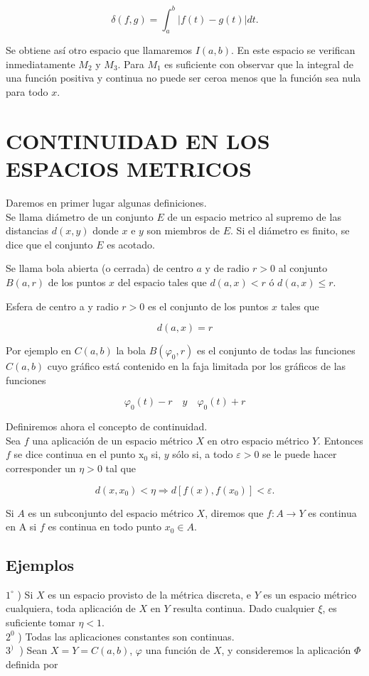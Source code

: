 \documentclass[10pt]{article}
\theoremstyle{plain}
\theoremstyle{definition}
\theoremstyle{remark}
\begin{document}
\begin{equation*}
\delta(f, g)=\int_{a}^{b}|f(t)-g(t)| d t . \tag{$1\cdot3$}
\end{equation*}


Se obtiene así otro espacio que llamaremos $I(a, b)$. En este espacio se verifican inmediatamente $M_{2}$ y $M_{3}$. Para $M_{1}$ es suficiente con observar que la integral de una función positiva y continua no puede ser ceroa menos que la función sea nula para todo $x$.

\section*{CONTINUIDAD EN LOS ESPACIOS METRICOS}
Daremos en primer lugar algunas definiciones.\\
Se llama diámetro de un conjunto $E$ de un espacio metrico al supremo de las distancias $d(x, y)$ donde $x$ e $y$ son miembros de $E$. Si el diámetro es finito, se dice que el conjunto $E$ es acotado.

Se llama bola abierta (o cerrada) de centro $a$ y de radio $r>0$ al conjunto $B(a, r)$ de los puntos $x$ del espacio tales que $d(a, x)<r$ ó $d(a, x) \leqslant r$.

Esfera de centro a y radio $r>0$ es el conjunto de los puntos $x$ tales que

$$
d(a, x)=r
$$

Por ejemplo en $C(a, b)$ la bola $B\left(\varphi_{0}, r\right)$ es el conjunto de todas las funciones $C(a, b)$ cuyo gráfico está contenido en la faja limitada por los gráficos de las funciones

$$
\varphi_{0}(t)-r \quad y \quad \varphi_{0}(t)+r
$$

Definiremos ahora el concepto de continuidad.\\
Sea $f$ una aplicación de un espacio métrico $X$ en otro espacio métrico $Y$. Entonces $f$ se dice continua en el punto $\mathrm{x}_0$ si, $y$ sólo si, a todo $\varepsilon>0$ se le puede hacer corresponder un $\eta>0$ tal que


\begin{equation*}
d\left(x, x_0\right)<\eta \Rightarrow d\left[f(x), f\left(x_{0}\right)\right]<\varepsilon . \tag{1-4}
\end{equation*}


Si $A$ es un subconjunto del espacio métrico $X$, diremos que $f: A \rightarrow Y$ es continua en A si $f$ es continua en todo punto $x_{0} \in A$.

\subsection{Ejemplos}
$1^{\circ}$ ) Si $X$ es un espacio provisto de la métrica discreta, e $Y$ es un espacio métrico cualquiera, toda aplicación de $X$ en $Y$ resulta continua. Dado cualquier $\xi$, es suficiente tomar $\eta<1$.\\
$2^{0}$ ) Todas las aplicaciones constantes son continuas.\\
$3^{\text {) }}$ ) Sean $X=Y=C(a, b)$, $\varphi$ una función de $X$, y consideremos la aplicación $\Phi$ definida por
\end{document}
